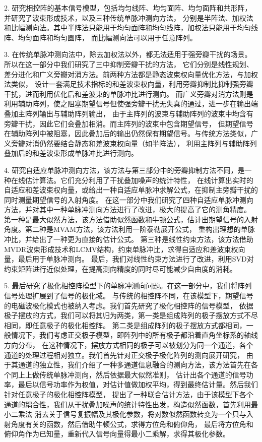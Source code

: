 \documentclass[master]{thesis-uestc}
\begin{document}
2. 研究相控阵的基本信号模型，包括均匀线阵、均匀面阵、均匀面阵和共形阵，并研究了波束形成技术，以及三种传统单脉冲测向方法，
分别是半阵法、加权法和比幅测向法。其中半阵法只能用于均匀面阵和均匀线阵，加权法只能用于均匀线阵、均匀面阵和均匀圆阵，
而比幅测向法可以用于任意阵列。

3. 在传统单脉冲测向法中，除去加权法以外，都无法适用于强旁瓣干扰的场景。所以在这一部分中我们研究了三中抑制旁瓣干扰的方法，
它们分别是线性规划、差分进化和广义旁瓣对消方法。前两种方法都是静态波束权向量优化方法，与加权法类似，
设计一套满足技术指标的和差波束权向量，利用旁瓣抑制比抑制强旁瓣干扰，进而利用优化后和差波束的单脉冲比进行测向。
而广义旁瓣对消方法则是利用辅助阵列，使之阻塞期望信号但使强旁瓣干扰无失真的通过，进一步在输出端叠加主阵列输出与辅助阵列输出，
由于主阵列的波束与辅助阵列的波束中均含有旁瓣干扰，因此它们会叠加相消。而主阵列的波束中包含期望信号，
但期望信号在辅助阵列中被阻塞，因此叠加后的输出仍然保有期望信号。与传统方法类似，广义旁瓣对消仍然要结合静态和差波束权向量（如半阵法），
利用主阵列与辅助阵列叠加后的和差波束形成单脉冲比进行测向。

4. 研究自适应单脉冲测向方法，该方法与第三部分中的旁瓣抑制方法不同，是一种在线估计算法。它们充分利用了干扰叠加噪声的统计特性，
在线计算出实时的自适应和差波束权向量，或给出一种自适应单脉冲求解公式，在抑制主旁瓣干扰的同时测量期望信号的入射角度。
在这一部分中我们研究了四种自适应单脉冲测向方法，并对其中一种单脉冲测向方法进行了改进，极大的提高了它的测角精度。
第一种是最大似然方法，该方法借助似然函数和牛顿公式，估计出期望信号的入射角度。第二种是MVAM方法，该方法利用一阶泰勒展开公式，
重构出理想的单脉冲比，并给出了一种更为直接的估计公式。
第三种是线性约束方法，该方法借助MVDR波束形成技术和LCMV结构，约束单脉冲比，求得自适应和差波束权向量，最后用于单脉冲测向。
最后，我们对线性约束方法进行了改进，利用SVD对约束矩阵进行近似处理，在提高测向精度的同时尽可能减少自由度的消耗。

5. 最后研究了极化相控阵模型下的单脉冲测向问题。在这一部分中，我们将阵列信号处理扩展到了信号的极化域。
与传统的相控阵不同，在该模型下，期望信号的电磁波极化模式也被纳入考虑。我们首先研究了极化相控阵的信号模型，
依据极子摆放的方式，我们可以将其归为两类，第一类是组成阵列的极子摆放方式不尽相同，即任意极子的极化相控阵。
第二类是组成阵列的极子摆放方式都相同，一般情况下，我们考虑正交极子模型，即阵列中的所有极子都沿着直角坐标系的轴线方向分布，
在这种情况下，摆放方式相同的极子可以被划分为同一个通道，各个通道的处理过程相对独立。我们首先针对正交极子极化阵列的测向展开研究，
由于其通道的独立性，我们介绍了一种多通道信息融合的测向方法，该方法首先在各个同上上做传统单脉冲测向，然后依据最大似然准则，
估计出各个通道的信号功率，最后以信号功率作为权值，对估计值做加权平均，得到最终估计量。然后我们针对任意极子的极化相控阵模型，
提出了一种联合估计方法，由于该模型下各个通道的耦合性，我们从干扰叠加噪声的统计特性出发，构造似然函数，首先利用最小二乘法
消去关于信号复振幅及其极化参数，将对数似然函数转变为一个只与入射角度有关的函数，然后借助牛顿公式，求得方位角和俯仰角，
最后将方位角和俯仰角作为已知量，重新代入信号向量得最小二乘解，求得其极化参数。
\end{document}
